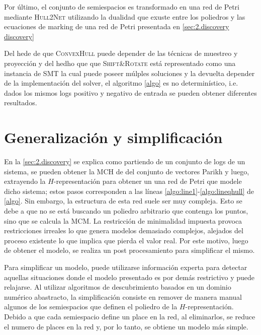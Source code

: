 Por último, el conjunto de semiespacios es transformado en una red de Petri mediante \textsc{Hull2Net} utilizando
la dualidad que exuste entre los poliedros y las ecuaciones de marking de una red de Petri
presentada en \autoref{sec:2.discovery discovery}

Del hede de que \textsc{ConvexHull} puede depender de las técnicas de muestreo y proyección y del
hedho que que \textsc{Shift\&Rotate} está representado como una instancia de SMT la cual puede poseer múlples soluciones
y la devuelta depender de la implementación del solver, el algoritmo \autoref{algo} es no determinístico, i.e. dados
los mismos logs positivo y negativo de entrada se pueden obtener diferentes resultados.

    
\section{Generalización y simplificación}
\label{sec:3.gensimp}

En la \autoref{sec:2.discovery} se explica como partiendo de un conjunto de logs de un sistema, se pueden
obtener la MCH de del conjunto de vectores Parikh y luego, extrayendo la $H$-representación para
obtener un una red de Petri que modele dicho sistema; estos pasos corresponden a las líneas \ref{algo:line1}-\ref{algo:lineqhull} 
de \autoref{algo}. Sin embargo, la estructura de esta red suele ser muy compleja. Esto se debe a que no se está
buscando un poliedro arbitrario que contenga los puntos, sino que se calcula la MCM. La restricción de minimalidad
impuesta provoca restricciones irreales lo que genera modelos demasiado complejos, alejados del proceso existente lo que
implica que pierda el valor real. Por este motivo, luego de obtener el modelo, se realiza un post procesamiento para simplificar
el mismo.

Para simplificar un modelo, puede utilizarse información experta para detectar aquellas situaciones donde el modelo 
presentado es por demás restrictivo y puede relajarse. Al utilizar algoritmos de descubrimiento basados en un dominio
numérico abastracto, la simplificación consiste en remover de manera manual algunos de los semiespacios que definen
el poliedro de la $H$-representación. Debido a que cada semiespacio define un place en la red, al eliminarlos, se 
reduce el numero de places en la red y, por lo tanto, se obtiene un modelo más simple.

